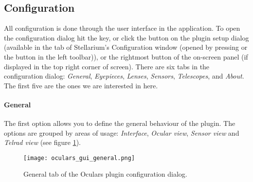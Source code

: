 \subsection{Configuration}
\label{sec:sec:plugins:Oculars:Configuration}
All configuration is done through the user interface in the application. 
To open the configuration dialog hit the  key, 
or click the  button on the plugin setup dialog (available in the
 tab of Stellarium's Configuration window (opened by 
pressing  or the  button in the left toolbar)), 
or the rightmost button of the on-screen panel (if displayed in the top right corner of screen). 
There are six tabs in the configuration dialog: \emph{General}, \emph{Eyepieces}, \emph{Lenses}, \emph{Sensors}, \emph{Telescopes}, and \emph{About}. The first five are the ones we are interested in here.

\paragraph{General}

The first option allows you to define the general behaviour of the plugin. 
The options are grouped by areas of usage: \emph{Interface}, \emph{Ocular view}, \emph{Sensor view} and \emph{Telrad view} (see figure \ref{fig:plugins:Oculars:Gui:General}).

\begin{figure}[ht]\centering
\texttt{[image: oculars\_gui\_general.png]}
\caption{General tab of the Oculars plugin configuration dialog.}
\label{fig:plugins:Oculars:Gui:General}
\end{figure}

